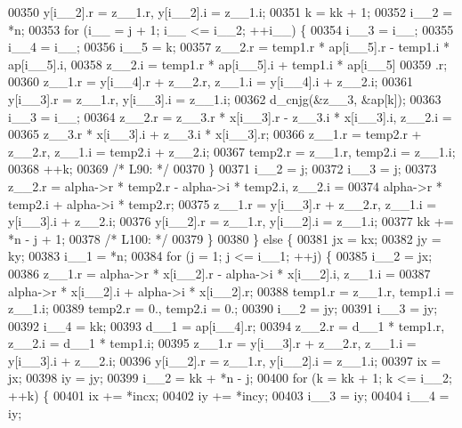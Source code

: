 \begin{DoxyCode}
00350         y[i\_\_2].r = z\_\_1.r, y[i\_\_2].i = z\_\_1.i;
00351         k = kk + 1;
00352         i\_\_2 = *n;
00353         \textcolor{keywordflow}{for} (i\_\_ = j + 1; i\_\_ <= i\_\_2; ++i\_\_) \{
00354             i\_\_3 = i\_\_;
00355             i\_\_4 = i\_\_;
00356             i\_\_5 = k;
00357             z\_\_2.r = temp1.r * ap[i\_\_5].r - temp1.i * ap[i\_\_5].i, 
00358                 z\_\_2.i = temp1.r * ap[i\_\_5].i + temp1.i * ap[i\_\_5]
00359                 .r;
00360             z\_\_1.r = y[i\_\_4].r + z\_\_2.r, z\_\_1.i = y[i\_\_4].i + z\_\_2.i;
00361             y[i\_\_3].r = z\_\_1.r, y[i\_\_3].i = z\_\_1.i;
00362             d\_cnjg(&z\_\_3, &ap[k]);
00363             i\_\_3 = i\_\_;
00364             z\_\_2.r = z\_\_3.r * x[i\_\_3].r - z\_\_3.i * x[i\_\_3].i, z\_\_2.i =
00365                  z\_\_3.r * x[i\_\_3].i + z\_\_3.i * x[i\_\_3].r;
00366             z\_\_1.r = temp2.r + z\_\_2.r, z\_\_1.i = temp2.i + z\_\_2.i;
00367             temp2.r = z\_\_1.r, temp2.i = z\_\_1.i;
00368             ++k;
00369 \textcolor{comment}{/* L90: */}
00370         \}
00371         i\_\_2 = j;
00372         i\_\_3 = j;
00373         z\_\_2.r = alpha->r * temp2.r - alpha->i * temp2.i, z\_\_2.i = 
00374             alpha->r * temp2.i + alpha->i * temp2.r;
00375         z\_\_1.r = y[i\_\_3].r + z\_\_2.r, z\_\_1.i = y[i\_\_3].i + z\_\_2.i;
00376         y[i\_\_2].r = z\_\_1.r, y[i\_\_2].i = z\_\_1.i;
00377         kk += *n - j + 1;
00378 \textcolor{comment}{/* L100: */}
00379         \}
00380     \} \textcolor{keywordflow}{else} \{
00381         jx = kx;
00382         jy = ky;
00383         i\_\_1 = *n;
00384         \textcolor{keywordflow}{for} (j = 1; j <= i\_\_1; ++j) \{
00385         i\_\_2 = jx;
00386         z\_\_1.r = alpha->r * x[i\_\_2].r - alpha->i * x[i\_\_2].i, z\_\_1.i =
00387              alpha->r * x[i\_\_2].i + alpha->i * x[i\_\_2].r;
00388         temp1.r = z\_\_1.r, temp1.i = z\_\_1.i;
00389         temp2.r = 0., temp2.i = 0.;
00390         i\_\_2 = jy;
00391         i\_\_3 = jy;
00392         i\_\_4 = kk;
00393         d\_\_1 = ap[i\_\_4].r;
00394         z\_\_2.r = d\_\_1 * temp1.r, z\_\_2.i = d\_\_1 * temp1.i;
00395         z\_\_1.r = y[i\_\_3].r + z\_\_2.r, z\_\_1.i = y[i\_\_3].i + z\_\_2.i;
00396         y[i\_\_2].r = z\_\_1.r, y[i\_\_2].i = z\_\_1.i;
00397         ix = jx;
00398         iy = jy;
00399         i\_\_2 = kk + *n - j;
00400         \textcolor{keywordflow}{for} (k = kk + 1; k <= i\_\_2; ++k) \{
00401             ix += *incx;
00402             iy += *incy;
00403             i\_\_3 = iy;
00404             i\_\_4 = iy;

\end{DoxyCode}
